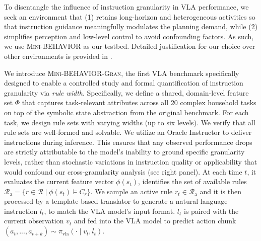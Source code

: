 \documentclass{article}
\begin{document}

To disentangle the influence of instruction granularity in VLA performance, we seek an environment that (1) retains long-horizon and heterogeneous activities so that instruction guidance meaningfully modulates the planning demand, while (2) simplifies perception and low-level control to avoid confounding factors. As such, we use \textsc{Mini-BEHAVIOR} \cite{jin2023minibehavior} as our testbed. Detailed justification for our choice over other environments is provided in .


We introduce \textsc{Mini-BEHAVIOR-Gran}, the first VLA benchmark specifically designed to enable a controlled study and formal quantification of instruction granularity via \emph{rule width}. Specifically, we define a shared, domain-level feature set $\Phi$ that captures task-relevant attributes across all 20 complex household tasks on top of the symbolic state abstraction from the original benchmark. For each task, we design rule sets with varying widths (up to six levels). We verify that all rule sets are well-formed and solvable. We utilize an Oracle Instructor to deliver instructions during inference. This ensures that any observed performance drops are strictly attributable to the model's inability to ground specific granularity levels, rather than stochastic variations in instruction quality or applicability that would confound our cross-granularity analysis (see  right panel). At each time $t$, it evaluates the current feature vector $\phi(s_t)$, identifies the set of available rules $\mathcal{R}_{\text{a}} = \{r \in \mathcal{R} \mid \phi(s_t) \models C_r\}$. We sample an active rule $r_t \in \mathcal{R}_{\text{a}}$ and it is then processed by a template-based translator to generate a natural language instruction $l_t$, to match the VLA model's input format. $l_t$ is paired with the current observation $v_t$ and fed into the VLA model to predict action chunk $(a_t, ..., a_{t+k}) \sim \pi_{\text{vla}}(\cdot \mid v_t, l_t)$.
\end{document}
